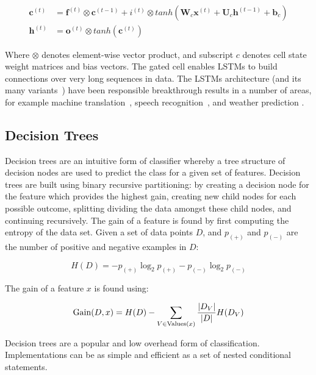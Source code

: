 \begin{align}
  \bm{c}^{(t)} &= \bm{f}^{(t)} \otimes \bm{c}^{(t-1)} + i^{(t)} \otimes tanh \left( \bm{W}_c \bm{x}^{(t)} + \bm{U}_c \bm{h}^{(t-1)} + \bm{b}_c \right) \\
  \bm{h}^{(t)} &= \bm{o}^{(t)} \otimes tanh ( \bm{c} ^{(t)} )
\end{align}

Where $\otimes$ denotes element-wise vector product, and subscript $c$ denotes cell state weight matrices and bias vectors. The gated cell enables LSTMs to build connections over very long sequences in data. The LSTMs architecture (and its many variants~\cite{Greff2015}) have been responsible breakthrough results in a number of areas, for example machine translation~\cite{Sutskever2014}, speech recognition~\cite{Graves2005}, and weather prediction \cite{Shi2015a}.


\subsection{Decision Trees}

Decision trees are an intuitive form of classifier whereby a tree structure of decision nodes are used to predict the class for a given set of features. Decision trees are built using binary recursive partitioning: by creating a decision node for the feature which provides the highest gain, creating new child nodes for each possible outcome, splitting dividing the data amongst these child nodes, and continuing recursively. The gain of a feature is found by first computing the entropy of the data set. Given a set of data points $D$, and $p_{(+)}$ and $p_{(-)}$ are the number of positive and negative examples in $D$:

\begin{equation}
  H(D) = - p_{(+)}\log_2p_{(+)} - p_{(-)}\log_2p_{(-)}
\end{equation}

The gain of a feature $x$ is found using:

\begin{equation}
  \operatorname*{Gain}(D, x) = H(D) - \sum_{V \in \text{Values}(x)}\frac{|D_V|}{|D|}H(D_V)
\end{equation}

Decision trees are a popular and low overhead form of classification. Implementations can be as simple and efficient as a set of nested conditional statements.

